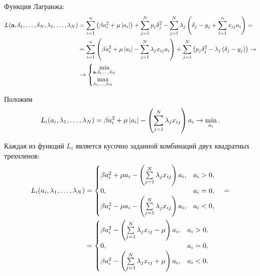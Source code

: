Функция Лагранжа:
\begin{equation}
	\label{LagrWEN}
	\begin{split}
		L(\boldsymbol{\mathbf{a}},\delta_{1},\ldots,\delta_{N}, \lambda_{1},\ldots,\lambda_{N}) 
	&= \sum\limits_{i=1}^n\left(\beta a_i^2 + \mu \left|a_i\right|\right) + \sum\limits_{j=1}^N p_j\delta_j^2 - \sum_{j=1}^N\lambda_j\left(\delta_j - y_j + \sum\limits_{i=1}^nx_{ij}a_i\right) = \\
	&= \sum\limits_{i=1}^n\left(\beta a_i^2 + \mu \left|a_i\right| - \sum\limits_{j=1}^N\lambda_jx_{ij}a_i\right) + \sum\limits_{j=1}^N \left(p_j\delta_j^2  - \lambda_j\left(\delta_j - y_j\right)\right) \to \\
	&\to 
	\begin{cases}
		\mathop{\mbox{min}}\limits_{\boldsymbol{\mathbf{a}},\delta_{1},\ldots,\delta_{N}}\\
		\mathop{\mbox{max}}\limits_{\lambda_{1},\ldots,\lambda_{N}}\\
	\end{cases}
	\end{split}
\end{equation}



\def\LiPart{L_i(a_i,\idots \lambda1N)}
\def\sumLambdaX{\suml_{j=1}^N\lambda_jx_{ij}}
\newcommand\diag[1]{\text{diag}\cbr{#1}}
Положим 
\begin{equation}
	\label{partialLagr}
	\LiPart = \beta a_i^2 + \mu \modul{a_i} - \cbr{\sumLambdaX}a_i \to \min_{a_i}.
\end{equation}

Каждая из функций $L_i$ является кусочно заданной комбинаций двух квадратных трехчленов:
\begin{equation}
	\label{partialLagrParted}
	\begin{split}
		\LiPart 
		&= \begin{cases}
			\beta a_i^2 + \mu a_i - \cbr{\sumLambdaX}a_i, &a_i > 0,\\
			0, &a_i = 0,\\
			\beta a_i^2 - \mu a_i - \cbr{\sumLambdaX}a_i, &a_i < 0,\\
		\end{cases} \quad= \\
		&= \begin{cases}
			\beta a_i^2 - \cbr{\sumLambdaX-\mu}a_i, &a_i > 0,\\
			0, &a_i = 0,\\
			\beta a_i^2 - \cbr{\sumLambdaX+\mu}a_i, &a_i < 0.\\
		\end{cases}	
	\end{split}
\end{equation}

